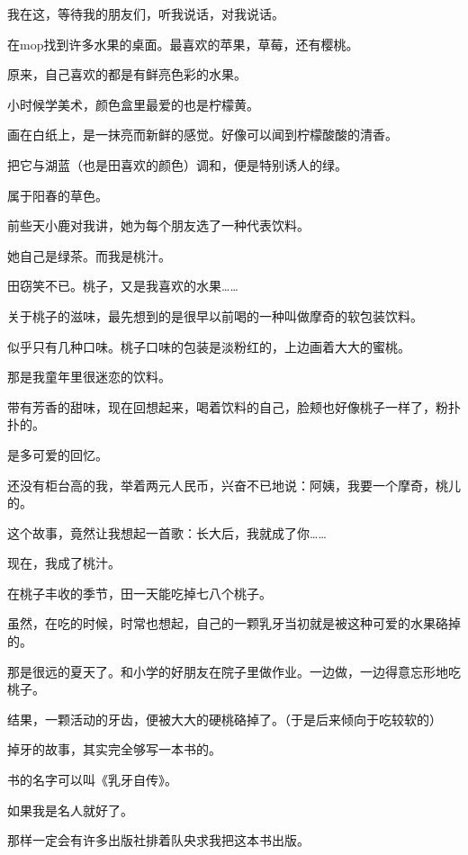 		\vspace{1em}
		我在这，等待我的朋友们，听我说话，对我说话。

	\endwriting



		在mop找到许多水果的桌面。最喜欢的苹果，草莓，还有樱桃。\par
		原来，自己喜欢的都是有鲜亮色彩的水果。\par
		小时候学美术，颜色盒里最爱的也是柠檬黄。\par
		画在白纸上，是一抹亮而新鲜的感觉。好像可以闻到柠檬酸酸的清香。\par
		把它与湖蓝（也是田喜欢的颜色）调和，便是特别诱人的绿。\par
		属于阳春的草色。

		\vspace{1em}
		前些天小鹿对我讲，她为每个朋友选了一种代表饮料。\par
		她自己是绿茶。而我是桃汁。\par
		田窃笑不已。桃子，又是我喜欢的水果……\par
		关于桃子的滋味，最先想到的是很早以前喝的一种叫做摩奇的软包装饮料。\par
		似乎只有几种口味。桃子口味的包装是淡粉红的，上边画着大大的蜜桃。\par
		那是我童年里很迷恋的饮料。\par
		带有芳香的甜味，现在回想起来，喝着饮料的自己，脸颊也好像桃子一样了，粉扑扑的。\par
		是多可爱的回忆。\par
		还没有柜台高的我，举着两元人民币，兴奋不已地说：阿姨，我要一个摩奇，桃儿的。\par
		这个故事，竟然让我想起一首歌：长大后，我就成了你……

		\vspace{1em}
		现在，我成了桃汁。\par
		在桃子丰收的季节，田一天能吃掉七八个桃子。\par
		虽然，在吃的时候，时常也想起，自己的一颗乳牙当初就是被这种可爱的水果硌掉的。\par
		那是很远的夏天了。和小学的好朋友在院子里做作业。一边做，一边得意忘形地吃桃子。\par
		结果，一颗活动的牙齿，便被大大的硬桃硌掉了。（于是后来倾向于吃较软的）\par
		掉牙的故事，其实完全够写一本书的。\par
		书的名字可以叫《乳牙自传》。\par
		如果我是名人就好了。\par
		那样一定会有许多出版社排着队央求我把这本书出版。

